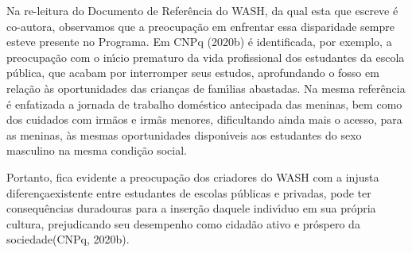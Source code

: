 \documentclass[
12pt,		%
openright,	%
twoside,  %
a4paper,			%
chapter=TITLE,		%
english,			%
french,				%
spanish,			%
brazil				%
]{USPSC-classe/USPSC}
\begin{document}
Na re-leitura do Documento de Refer\^encia do WASH, da qual esta que escreve \'e co-autora, observamos que a preocupa\c{c}\~ao em enfrentar essa disparidade sempre esteve presente no Programa. Em  CNPq (2020b) \'e identificada, por exemplo, a preocupa\c{c}\~ao com o in\'{\i}cio prematuro da vida profissional dos estudantes da escola p\'ublica, que acabam por interromper seus estudos, aprofundando o fosso em rela\c{c}\~ao \`as oportunidades das crian\c{c}as de fam\'{\i}lias abastadas. Na mesma refer\^encia \'e enfatizada a jornada de trabalho dom\'estico antecipada  das meninas, bem como dos cuidados com irm\~aos e irm\~as menores, dificultando ainda mais o acesso, para as meninas, \`as mesmas oportunidades dispon\'{\i}veis aos estudantes do sexo masculino na mesma condi\c{c}\~ao social.

















Portanto, fica evidente a preocupa\c{c}\~ao dos criadores do WASH com a \textquotedbl injusta diferen\c{c}a\textquotedbl  existente entre estudantes de escolas p\'ublicas e privadas, \textquotedbl pode ter consequ\^encias duradouras para a inser\c{c}\~ao daquele indiv\'{\i}duo em sua pr\'opria cultura, prejudicando seu desempenho como cidad\~ao ativo e pr\'ospero da sociedade\textquotedbl   (CNPq, 2020b).


















\noindent\begin{center}\mbox{\centering{}}\end{center}
\end{document}
